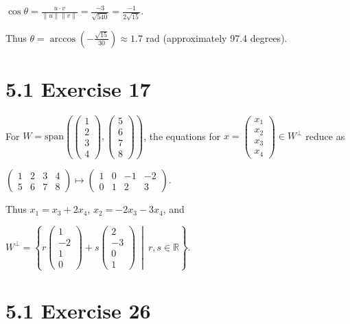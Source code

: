 \(\cos\theta = \frac{u \cdot v}{\left\| u \right\|\left\| v \right\|} = \frac{- 3}{\sqrt{540}} = \frac{- 1}{2\sqrt{15}}.\)

Thus \(\theta = \arccos\left( {- \frac{\sqrt{15}}{30}} \right) \approx 1.7\) rad (approximately 97.4 degrees).

\section{5.1 Exercise 17}

For \(W = \text{span}\left( {\begin{pmatrix}
1 \\
2 \\
3 \\
4
\end{pmatrix},\begin{pmatrix}
5 \\
6 \\
7 \\
8
\end{pmatrix}} \right)\), the equations for \(x = \begin{pmatrix}
x_{1} \\
x_{2} \\
x_{3} \\
x_{4}
\end{pmatrix} \in W^{\perp}\) reduce as

\(\begin{pmatrix}
1 & 2 & 3 & 4 \\
5 & 6 & 7 & 8
\end{pmatrix}\mapsto\begin{pmatrix}
1 & 0 & {- 1} & {- 2} \\
0 & 1 & 2 & 3
\end{pmatrix}.\)

Thus \(x_{1} = x_{3} + 2x_{4}\), \(x_{2} = - 2x_{3} - 3x_{4}\), and

\(W^{\perp} = \left\{ r\begin{pmatrix}
1 \\
{- 2} \\
1 \\
0
\end{pmatrix} + s\begin{pmatrix}
2 \\
{- 3} \\
0 \\
1
\end{pmatrix}\  \middle| \ r,s \in \mathbb{R} \right\}.\)

\section{5.1 Exercise 26}

